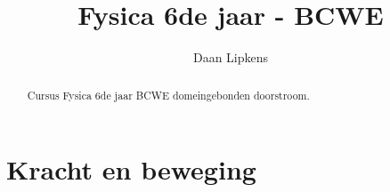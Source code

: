 \documentclass[nonewpage]{xourse}
\title{Fysica 6de jaar - BCWE}
\author{Daan Lipkens}
\begin{document}
\begin{abstract}
    Cursus Fysica 6de jaar BCWE domeingebonden doorstroom.
\end{abstract}
\maketitle






\part{Kracht en beweging} %


\end{document}

